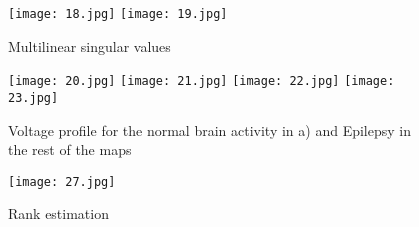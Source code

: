 \begin{figure}[!htbp]
%
\centering
\texttt{[image: 18.jpg]}
\label{a18}
\endminipage\hfill
{}%
\centering
\texttt{[image: 19.jpg]}
\label{a19}
\endminipage\hfill
\caption{Multilinear singular values}
\end{figure}

\begin{figure}[!htbp]
%
\centering
\texttt{[image: 20.jpg]}
\label{a20}
\endminipage\hfill
{}%
\centering
\texttt{[image: 21.jpg]}
\label{a21}
\endminipage\hfill
{}%
\centering
\texttt{[image: 22.jpg]}
\label{a22}
\endminipage\hfill
{}%
\centering
\texttt{[image: 23.jpg]}
\label{a23}
\endminipage\hfill
\caption{Voltage profile for the normal brain activity in a) and Epilepsy in the rest of the maps}\label{a}
\end{figure}


\begin{figure}[!htbp]
\centering
\texttt{[image: 27.jpg]}
\caption{Rank estimation}\label{A2}

\end{figure}